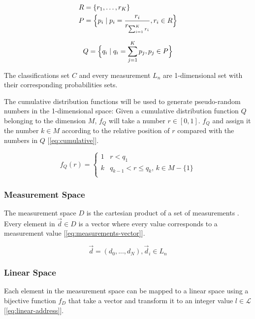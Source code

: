 \documentclass[letterpaper, conference]{IEEEtran}
\begin{document}
\begin{equation}\label{eq:pmf}
  \begin{aligned}
  R &= \{r_1, \dots, r_K\} \\
  P &= \Bigl\{p_i \mid p_i = \frac{r_i}{r_{\sum_{i = 1}^{K} r_i}}, r_i \in R \Bigr\}
  \end{aligned}
\end{equation}

\begin{equation}\label{eq:cdf}
Q = \Bigl\{q_i \mid q_i = \sum_{j = 1}^{K} p_j, p_j \in P \Bigr\}
\end{equation}

The classifications set $C$ and every measurement $L_n$ are 1-dimensional set with their corresponding probabilities sets.

The cumulative distribution functions will be used to generate pseudo-random numbers in the 1-dimensional space: Given a cumulative distribution function $Q$ belonging to the dimension $M$, $f_Q$ will take a number $r \in [0, 1]$. $f_Q$ and assign it the number $k \in M$ according to the relative position of $r$ compared with the numbers in $Q$ [\ref{eq:cumulative}].

\begin{equation}\label{eq:cumulative}
  f_Q(r) =
  \begin{cases}
  1 & r < q_1 \\
  k & q_{k - 1} < r \leq q_k,\, k \in M - \{1\} \\
  \end{cases}
\end{equation}

\subsubsection{Measurement Space}
The measurement space $D$ is the cartesian product of a set of measurements \label{eq:measurement-space}. Every element in $\vec{d} \in D$ is a vector where every value corresponds to a measurement value [\ref{eq:measurements-vector}].

\begin{equation}\label{eq:measurements-vector}
  \vec{d} = (d_0, ..., d_N), \vec{d}_i \in L_n
\end{equation}

\subsubsection{Linear Space}
Each element in the measurement space can be mapped to a linear space using a bijective function $f_D$ that take a vector and transform it to an integer value $l \in \mathcal{L}$ [\ref{eq:linear-address}].
\end{document}
